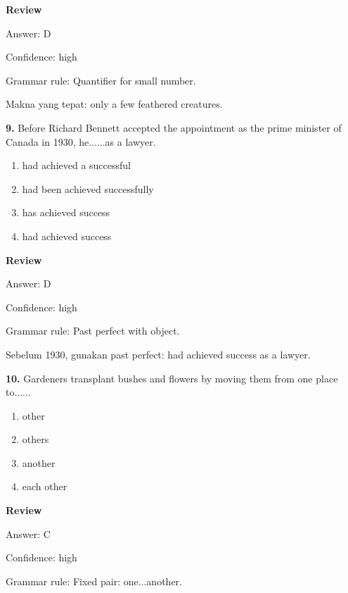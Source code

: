 \documentclass[12pt]{article}
\begin{document}
\par
\begingroup
\setlength{\parskip}{0pt}
\setlength{\parindent}{0pt}
\textbf{Review}\par
Answer: D\par
Confidence: high\par
Grammar rule: Quantifier for small number.\par
Makna yang tepat: only a few feathered creatures.\par
\endgroup
\par
\vspace{0.25\baselineskip}
\noindent\textbf{9.} Before Richard Bennett accepted the appointment as the prime minister of Canada in 1930, he......as a lawyer.
\begin{enumerate}[label=(\Alph*),leftmargin=*,itemsep=0.2em]
\item had achieved a successful
\item had been achieved successfully
\item has achieved success
\item had achieved success
\end{enumerate}
\par
\begingroup
\setlength{\parskip}{0pt}
\setlength{\parindent}{0pt}
\textbf{Review}\par
Answer: D\par
Confidence: high\par
Grammar rule: Past perfect with object.\par
Sebelum 1930, gunakan past perfect: had achieved success as a lawyer.\par
\endgroup
\par
\vspace{0.25\baselineskip}
\noindent\textbf{10.} Gardeners transplant bushes and flowers by moving them from one place to......
\begin{enumerate}[label=(\Alph*),leftmargin=*,itemsep=0.2em]
\item other
\item others
\item another
\item each other
\end{enumerate}
\par
\begingroup
\setlength{\parskip}{0pt}
\setlength{\parindent}{0pt}
\textbf{Review}\par
Answer: C\par
Confidence: high\par
Grammar rule: Fixed pair: one...another.\par
\end{document}
